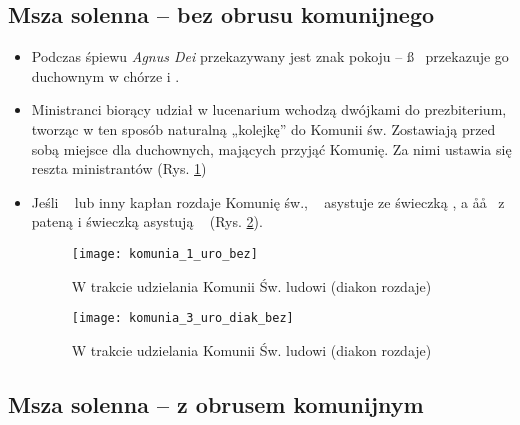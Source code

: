 		\clearpage
		
		\subsection{Msza solenna -- bez obrusu komunijnego}
			
			\begin{itemize}
				\item Podczas śpiewu \textit{Agnus Dei} przekazywany jest znak pokoju – \ss~ przekazuje go duchownym w chórze i \cc\cc.
				\item Ministranci biorący udział w lucenarium wchodzą dwójkami do prezbiterium, tworząc w ten sposób naturalną „kolejkę” do Komunii św. Zostawiają przed sobą miejsce dla duchownych, mających przyjąć Komunię. Za nimi ustawia się reszta ministrantów (Rys. \ref{fig:komunia_1_uro_bez})
				\item Jeśli \dd~ lub inny kapłan rozdaje Komunię św., \cc~ asystuje ze świeczką \ii, a \aa\aa~ z pateną i świeczką asystują \dd~ (Rys. \ref{fig:komunia_3_uro_diak_bez}).
				
				\begin{figure}[ht]
					\centering
					\texttt{[image: komunia\_1\_uro\_bez]}
					\caption{W trakcie udzielania Komunii Św. ludowi (diakon rozdaje)}
					\label{fig:komunia_1_uro_bez}
				\end{figure}
				
				\begin{figure}[ht]
					\centering
					\texttt{[image: komunia\_3\_uro\_diak\_bez]}
					\caption{W trakcie udzielania Komunii Św. ludowi (diakon rozdaje)}
					\label{fig:komunia_3_uro_diak_bez}
				\end{figure}
			\end{itemize}
		
		\subsection{Msza solenna -- z obrusem komunijnym}
			
